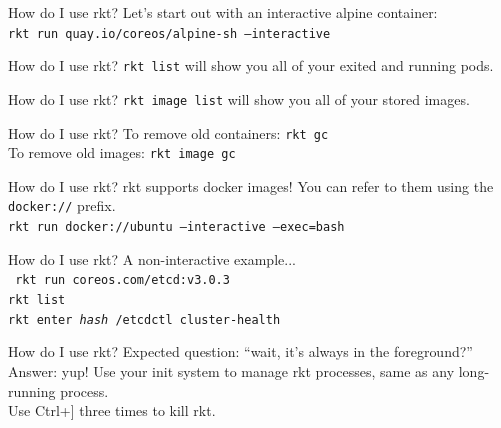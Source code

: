 \documentclass[pdf,aspectratio=169,14pt]{beamer}
\begin{document}
\begin{frame}{How do I use rkt?}
    Let's start out with an interactive alpine container: \\
    \texttt{rkt run quay.io/coreos/alpine-sh --interactive}
\end{frame}

\begin{frame}{How do I use rkt?}
    \texttt{rkt list} will show you all of your exited and running pods.
\end{frame}

\begin{frame}{How do I use rkt?}
    \texttt{rkt image list} will show you all of your stored images.
\end{frame}

\begin{frame}{How do I use rkt?}
    To remove old containers: \texttt{rkt gc} \\
    To remove old images: \texttt{rkt image gc}
\end{frame}

\begin{frame}{How do I use rkt?}
    rkt supports docker images! You can refer to them using the
    \texttt{docker://} prefix. \\
    \vspace{1em}
    \texttt{rkt run docker://ubuntu --interactive --exec=bash} 
\end{frame}

\begin{frame}{How do I use rkt?}
    A non-interactive example... \\
    \vspace{1em}
    \texttt{\noindent
        rkt run coreos.com/etcd:v3.0.3 \\
        rkt list \\
        rkt enter \textit{hash} /etcdctl cluster-health
    }
\end{frame}

\begin{frame}{How do I use rkt?}
    Expected question: ``wait, it's always in the foreground?'' \\
    \pause
    \vspace{1em}
    Answer: yup! Use your init system to manage rkt processes, same as any
    long-running process. \\
    Use Ctrl+] three times to kill rkt.
\end{frame}
\end{document}
